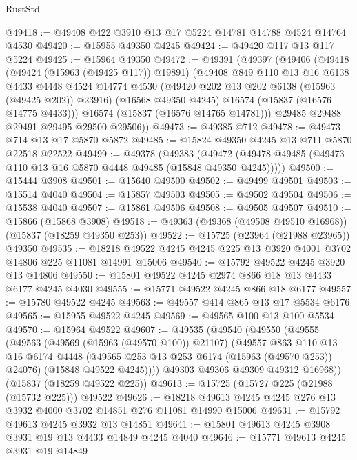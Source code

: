 \begin{lexlean}{RustStd}
\begin{coremodule}
{\begin{coremodule}
{{{{{{{{{{{{{{{{{{{{{{{{{{{{{{{{{{{{{{{{{{{{{{{{{{{{{{{{{{{{@49418 := @49408 @422 @3910 @13 @17 @5224 @14781 @14788 @4524 @14764 @4530
@49420 := @15955 @49350 @4245
@49424 := @49420 @117 @13 @117 @5224
@49425 := @15964 @49350
@49472 := @49391
    (@49397
      (@49406
        (@49418
          (@49424 (@15963 (@49425 @117)) @19891)
          (@49408
            @849
            @110
            @13
            @16
            @6138
            @4433
            @4448
            @4524
            @14774
            @4530
            (@49420 @202 @13 @202 @6138 (@15963 (@49425 @202)) @23916)
            (@16568 @49350 @4245)
            @16574
            (@15837 (@16576 @14775 @4433)))
          @16574
          (@15837 (@16576 @14765 @14781)))
        @29485
        @29488
        @29491
        @29495
        @29500
        @29506))
@49473 := @49385 @712
@49478 := @49473 @714 @13 @17 @5870 @5872
@49485 := @15824 @49350 @4245 @13 @711 @5870 @22518 @22522
@49499 := @49378
    (@49383 (@49472 (@49478 @49485 (@49473 @110 @13 @16 @5870 @4448 @49485 (@15848 @49350 @4245)))))
@49500 := @15444 @3908
@49501 := @15640 @49500
@49502 := @49499 @49501
@49503 := @15514 @4040
@49504 := @15857 @49503
@49505 := @49502 @49504
@49506 := @15538 @4040
@49507 := @15861 @49506
@49508 := @49505 @49507
@49510 := @15866 (@15868 @3908)
@49518 := @49363 (@49368 (@49508 @49510 @16968)) (@15837 (@18259 @49350 @253))
@49522 := @15725 (@23964 (@21988 @23965)) @49350
@49535 := @18218 @49522 @4245 @4245 @225 @13 @3920 @4001 @3702 @14806 @225 @11081 @14991 @15006
@49540 := @15792 @49522 @4245 @3920 @13 @14806
@49550 := @15801 @49522 @4245 @2974 @866 @18 @13 @4433 @6177 @4245 @4030
@49555 := @15771 @49522 @4245 @866 @18 @6177
@49557 := @15780 @49522 @4245
@49563 := @49557 @414 @865 @13 @17 @5534 @6176
@49565 := @15955 @49522 @4245
@49569 := @49565 @100 @13 @100 @5534
@49570 := @15964 @49522
@49607 := @49535
    (@49540
      (@49550
        (@49555
          (@49563
            (@49569 (@15963 (@49570 @100)) @21107)
            (@49557
              @863
              @110
              @13
              @16
              @6174
              @4448
              (@49565 @253 @13 @253 @6174 (@15963 (@49570 @253)) @24076)
              (@15848 @49522 @4245))))
        @49303
        @49306
        @49309
        @49312
        @16968))
    (@15837 (@18259 @49522 @225))
@49613 := @15725 (@15727 @225 (@21988 (@15732 @225))) @49522
@49626 := @18218 @49613 @4245 @4245 @276 @13 @3932 @4000 @3702 @14851 @276 @11081 @14990 @15006
@49631 := @15792 @49613 @4245 @3932 @13 @14851
@49641 := @15801 @49613 @4245 @3908 @3931 @19 @13 @4433 @14849 @4245 @4040
@49646 := @15771 @49613 @4245 @3931 @19 @14849
}}}}}}}}}}}}}}}}}}}}}}}}}}}}}}}}}}}}}}}}}}}}}}}}}}}}}}}}}}}}
\end{coremodule}}
\end{coremodule}
\end{lexlean}
